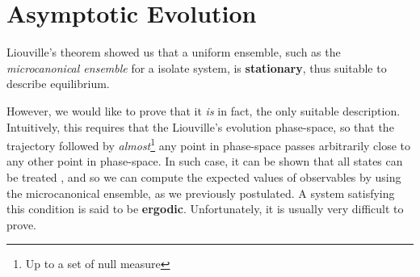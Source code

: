 \documentclass[../../main.tex]{subfiles}
\begin{document}
\section{Asymptotic Evolution}
Liouville's theorem showed us that a uniform ensemble, such as the \textit{microcanonical ensemble} for a isolate system, is \textbf{stationary}, thus suitable to describe equilibrium.

However, we would like to prove that it \textit{is} in fact, the only suitable description. Intuitively, this requires that the Liouville's evolution  phase-space, so that the trajectory followed by \textit{almost}\footnote{Up to a set of null measure} any point in phase-space passes arbitrarily close to any other point in phase-space. In such case, it can be shown that all states can be treated , and so we can compute the expected values of observables by using the microcanonical ensemble, as we previously postulated. A system satisfying this condition is said to be \textbf{ergodic}. Unfortunately, it is usually very difficult to prove.

\medskip
\end{document}
